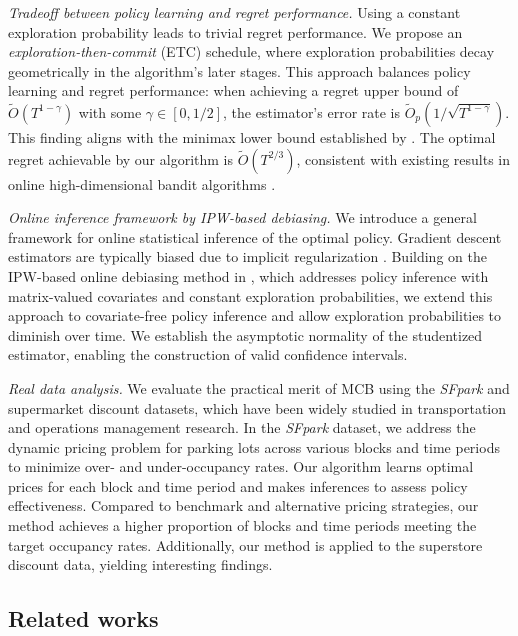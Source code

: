\documentclass[12pt]{article}
\def\tilde{\widetilde}
\theoremstyle{plain}
\begin{document}
\emph{Tradeoff between policy learning and regret performance.} Using a constant exploration probability leads to trivial regret performance. We propose an \emph{exploration-then-commit} (ETC) schedule, where exploration probabilities decay geometrically in the algorithm's later stages. This approach balances policy learning and regret performance: when achieving a regret upper bound of $\widetilde{O}(T^{1-\gamma})$ with some $\gamma\in [0,1/2]$, the estimator's error rate is $\tilde{O}_p(1/\sqrt{T^{1-\gamma}})$. This finding aligns with the minimax lower bound established by \citet{simchi2023multi}. The optimal regret achievable by our algorithm is $\tilde{O}(T^{2/3})$, consistent with existing results in online high-dimensional bandit algorithms \citep{hao2020high, ma2023high}.


\emph{Online inference framework by IPW-based debiasing.} We introduce a general framework for online statistical inference of the optimal policy.  Gradient descent estimators are typically biased due to implicit regularization \citep{NEURIPS2019_c0c783b5, chen2020noisy}. Building on the IPW-based online debiasing method in \citet{han2022online}, which addresses policy inference with matrix-valued covariates and constant exploration probabilities, we extend this approach to covariate-free policy inference and allow exploration probabilities to diminish over time. We establish the asymptotic normality of the studentized estimator, enabling the construction of valid confidence intervals. 

\emph{Real data analysis.} We evaluate the practical merit of MCB using the \emph{SFpark} and supermarket discount datasets, which have been widely studied in transportation and operations management research. In the \emph{SFpark} dataset, we address the dynamic pricing problem for parking lots across various blocks and time periods to minimize over- and under-occupancy rates. Our algorithm learns optimal prices for each block and time period and makes inferences to assess policy effectiveness. Compared to benchmark and alternative pricing strategies, our method achieves a higher proportion of blocks and time periods meeting the target occupancy rates. Additionally, our method is applied to the superstore discount data, yielding interesting findings. 




\subsection{Related works}
\end{document}
